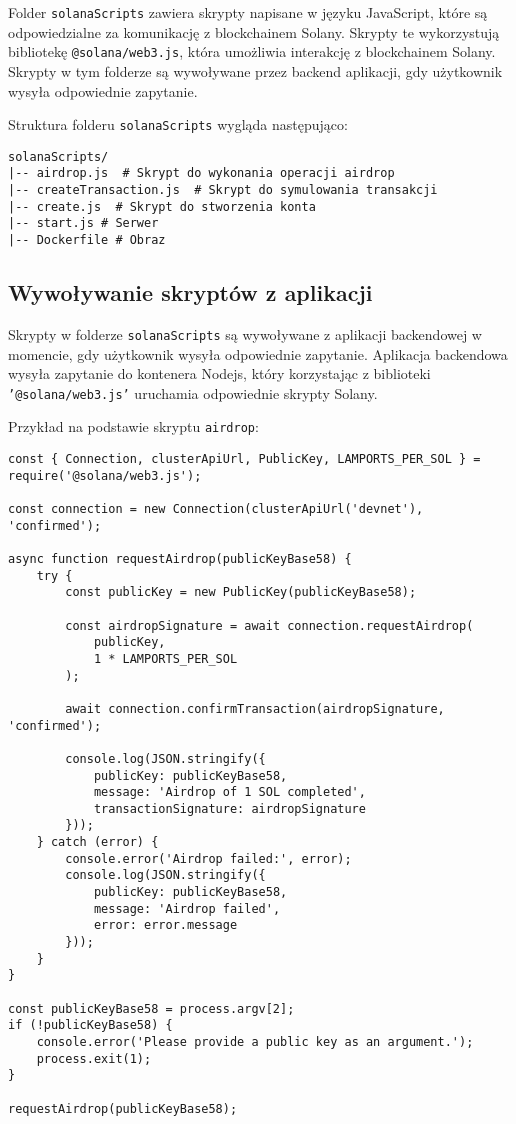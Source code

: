 Folder \texttt{solanaScripts} zawiera skrypty napisane w języku JavaScript, które są odpowiedzialne za komunikację z blockchainem Solany. Skrypty te wykorzystują bibliotekę \texttt{@solana/web3.js}, która umożliwia interakcję z blockchainem Solany. Skrypty w tym folderze są wywoływane przez backend aplikacji, gdy użytkownik wysyła odpowiednie zapytanie.

Struktura folderu \texttt{solanaScripts} wygląda następująco:

\begin{verbatim}
solanaScripts/
|-- airdrop.js  # Skrypt do wykonania operacji airdrop
|-- createTransaction.js  # Skrypt do symulowania transakcji
|-- create.js  # Skrypt do stworzenia konta
|-- start.js # Serwer
|-- Dockerfile # Obraz 
\end{verbatim}

\subsection{Wywoływanie skryptów z aplikacji}

Skrypty w folderze \texttt{solanaScripts} są wywoływane z aplikacji backendowej w momencie, gdy użytkownik wysyła odpowiednie zapytanie. Aplikacja backendowa  wysyła zapytanie do kontenera Nodejs, który korzystając z biblioteki \texttt{'@solana/web3.js'} uruchamia odpowiednie skrypty Solany.

Przykład na podstawie skryptu \texttt{airdrop}:

\begin{lstlisting}
const { Connection, clusterApiUrl, PublicKey, LAMPORTS_PER_SOL } = require('@solana/web3.js');

const connection = new Connection(clusterApiUrl('devnet'), 'confirmed');

async function requestAirdrop(publicKeyBase58) {
    try {
        const publicKey = new PublicKey(publicKeyBase58);

        const airdropSignature = await connection.requestAirdrop(
            publicKey,
            1 * LAMPORTS_PER_SOL
        );

        await connection.confirmTransaction(airdropSignature, 'confirmed');

        console.log(JSON.stringify({
            publicKey: publicKeyBase58,
            message: 'Airdrop of 1 SOL completed',
            transactionSignature: airdropSignature
        }));
    } catch (error) {
        console.error('Airdrop failed:', error);
        console.log(JSON.stringify({
            publicKey: publicKeyBase58,
            message: 'Airdrop failed',
            error: error.message
        }));
    }
}

const publicKeyBase58 = process.argv[2];
if (!publicKeyBase58) {
    console.error('Please provide a public key as an argument.');
    process.exit(1);
}

requestAirdrop(publicKeyBase58);

\end{lstlisting}

